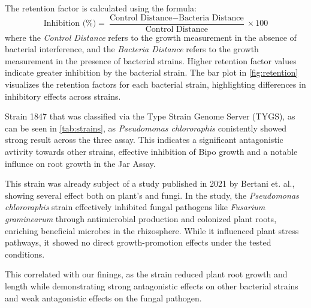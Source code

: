 \vspace{0.5cm} %

\noindent
The retention factor is calculated using the formula:
\[
\text{Inhibition (\%)} = \frac{\text{Control Distance} - \text{Bacteria Distance}}{\text{Control Distance}} \times 100
\]
where the \textit{Control Distance} refers to the growth measurement in the absence of bacterial interference, and the \textit{Bacteria Distance} refers to the growth measurement in the presence of bacterial strains. Higher retention factor values indicate greater inhibition by the bacterial strain. The bar plot in \autoref{fig:retention} visualizes the retention factors for each bacterial strain, highlighting differences in inhibitory effects across strains.


Strain 1847 that was classified via the Type Strain Genome Server (TYGS), as can be seen in \autoref{tab:strains}, as \textit{Pseudomonas chlororaphis} conistently showed strong result across the three assay. This indicates a significant antagonistic avtivity towards other strains, effective inhibition of \ac{Bipo} growth and a notable influnce on root growth in the Jar Assay.

This strain was already subject of a study published in 2021 by Bertani et. al., showing several effect both on plant's and fungi. 
In the study, the \textit{Pseudomonas chlororaphis} strain effectively inhibited fungal pathogens like \textit{Fusarium graminearum} through antimicrobial production and colonized plant roots, enriching beneficial microbes in the rhizosphere. While it influenced plant stress pathways, it showed no direct growth-promotion effects under the tested conditions. \cite{bertani2021Isolation}

This correlated with our finings, as the strain reduced plant root growth and length while demonstrating  strong antagonistic effects on other bacterial strains and weak antagonistic effects on the fungal pathogen.